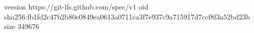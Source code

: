 version https://git-lfs.github.com/spec/v1
oid sha256:fb1fd2c47b2b80e0849ea0613a0711ca3f7e937c9a715917d7ccf8f3a52bd23b
size 349676
